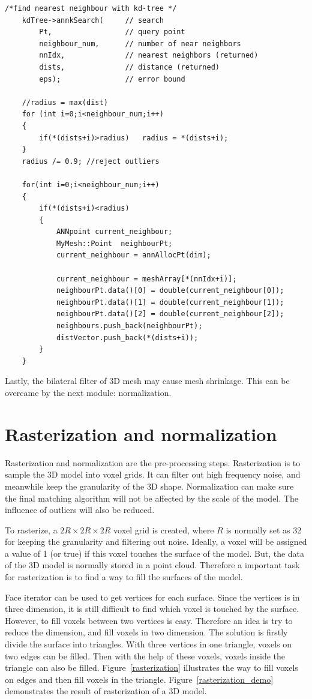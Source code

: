 \begin{lstlisting}[xleftmargin=0em]
/*find nearest neighbour with kd-tree */
	kdTree->annkSearch(		// search
		Pt,					// query point
		neighbour_num,      // number of near neighbors
		nnIdx,				// nearest neighbors (returned)
		dists,				// distance (returned)
		eps);				// error bound

	//radius = max(dist)
	for (int i=0;i<neighbour_num;i++)
	{
		if(*(dists+i)>radius)	radius = *(dists+i); 
	}
	radius /= 0.9; //reject outliers

	for(int i=0;i<neighbour_num;i++)
	{
		if(*(dists+i)<radius)
		{
			ANNpoint current_neighbour;
			MyMesh::Point  neighbourPt;
			current_neighbour = annAllocPt(dim);

			current_neighbour = meshArray[*(nnIdx+i)];
			neighbourPt.data()[0] = double(current_neighbour[0]);
			neighbourPt.data()[1] = double(current_neighbour[1]);
			neighbourPt.data()[2] = double(current_neighbour[2]);
			neighbours.push_back(neighbourPt);
			distVector.push_back(*(dists+i));
		}
	}
\end{lstlisting}

Lastly, the bilateral filter of 3D mesh may cause mesh shrinkage. This can be overcame by the next module: normalization. 

\section{Rasterization and normalization}

Rasterization and normalization are the pre-processing steps. Rasterization is to sample the 3D model into voxel grids. It can filter out high frequency noise, and meanwhile keep the granularity of the 3D shape. Normalization can make sure the final matching algorithm will not be affected by the scale of the model. The influence of outliers will also be reduced. 

To rasterize, a $2R\times2R\times2R$ voxel grid is created, where $R$ is normally set as 32 for keeping the granularity and filtering out noise. Ideally, a voxel will be assigned a value of 1 (or true) if this voxel touches the surface of the model. But, the data of the 3D model is normally stored in a point cloud. Therefore a important task for rasterization is to find a way to fill the surfaces of the model. 

Face iterator can be used to get vertices for each surface. Since the vertices is in three dimension, it is still difficult to find which voxel is touched by the surface. However, to fill voxels between two vertices is easy. Therefore an idea is try to reduce the dimension, and fill voxels in two dimension. The solution is firstly divide the surface into triangles. With three vertices in one triangle, voxels on two edges can be filled. Then with the help of these voxels, voxels inside the triangle can also be filled. Figure~\ref{rasterization} illustrates the way to fill voxels on edges and then fill voxels in the triangle. Figure~\ref{rasterization_demo} demonstrates the result of rasterization of a 3D model.

